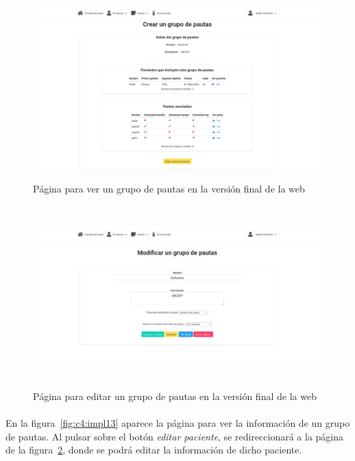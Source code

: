\begin{figure}[H]
    \centering
    \includegraphics[height=7cm, width=\textwidth]{Imagenes/12-verGrupo.png}
    \caption[Página para ver un grupo de pautas en la versión final de la web]{Página para ver un grupo de pautas en la versión final de la web}
    \label{fig:c4:impl16}
\end{figure}

\begin{figure}[H]
    \centering
    \includegraphics[height=7cm, width=\textwidth]{Imagenes/13-editarGrupo.png}
    \caption[Página para editar un grupo de pautas en la versión final de la web]{Página para editar un grupo de pautas en la versión final de la web}
    \label{fig:c4:impl17}
\end{figure}

\paragraph{}
En la figura~\ref{fig:c4:impl13} aparece la página para ver la información de un grupo de pautas. Al pulsar sobre el botón \textit{editar paciente}, se redireccionará a la página de la figura~\ref{fig:c4:impl17}, donde se podrá editar la información de dicho paciente.

